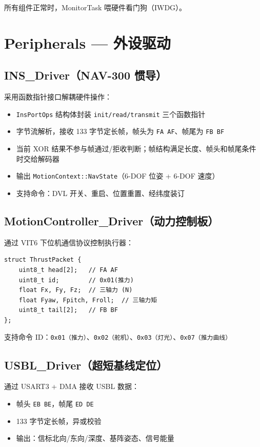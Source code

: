 \documentclass[12pt,a4paper]{article}
\begin{document}
所有组件正常时，MonitorTask 喂硬件看门狗（IWDG）。

\section{Peripherals — 外设驱动}

\subsection{INS\_Driver（NAV-300 惯导）}

采用函数指针接口解耦硬件操作：

\begin{itemize}
    \item \texttt{InsPortOps} 结构体封装 \texttt{init/read/transmit} 三个函数指针
    \item 字节流解析，接收 133 字节定长帧，帧头为 \texttt{FA AF}、帧尾为 \texttt{FB BF}
    \item 当前 XOR 结果不参与帧通过/拒收判断；帧结构满足长度、帧头和帧尾条件时交给解码器
    \item 输出 \texttt{MotionContext::NavState}（6-DOF 位姿 + 6-DOF 速度）
    \item 支持命令：DVL 开关、重启、位置重置、经纬度装订
\end{itemize}

\subsection{MotionController\_Driver（动力控制板）}

通过 VIT6 下位机通信协议控制执行器：

\begin{lstlisting}[caption={协议数据包格式}]
struct ThrustPacket {
    uint8_t head[2];   // FA AF
    uint8_t id;        // 0x01(推力)
    float Fx, Fy, Fz;  // 三轴力 (N)
    float Fyaw, Fpitch, Froll;  // 三轴力矩
    uint8_t tail[2];   // FB BF
};
\end{lstlisting}

支持命令 ID：\texttt{0x01（推力）}、\texttt{0x02（舵机）}、\texttt{0x03（灯光）}、\texttt{0x07（推力曲线）}

\subsection{USBL\_Driver（超短基线定位）}

通过 USART3 + DMA 接收 USBL 数据：
\begin{itemize}
    \item 帧头 \texttt{EB BE}，帧尾 \texttt{ED DE}
    \item 133 字节定长帧，异或校验
    \item 输出：信标北向/东向/深度、基阵姿态、信号能量
\end{itemize}
\end{document}
